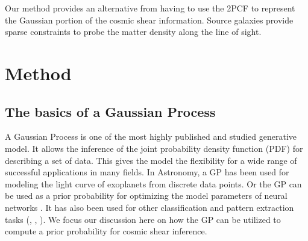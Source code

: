 Our method provides an alternative from having to use the 2PCF to represent the
Gaussian portion of the cosmic shear information. 
Source galaxies provide sparse constraints to probe the matter density along
the line of sight. 

\section{Method}

\subsection{The basics of a Gaussian Process}
A Gaussian Process is one of the most highly published and studied 
generative model. It allows the inference of the joint probability density 
function (PDF) for describing a set of data. 
This gives the model the flexibility for a wide range
of successful applications in many fields. 
In Astronomy, a GP has been used for modeling 
the light curve of exoplanets from discrete data points\citep{Ambikasaran2014a}.
Or the GP can be used as a prior probability for optimizing the model parameters of
neural networks \citep{Snoek2012}. 
It has also been used for other classification and pattern extraction tasks 
(\citealt{Wilson2013}, \citealt{Duvenaud2013}, \citealt{Rasmussen2006}).
We focus our discussion here on how the GP can be utilized to compute a prior
probability for cosmic shear inference.
 
